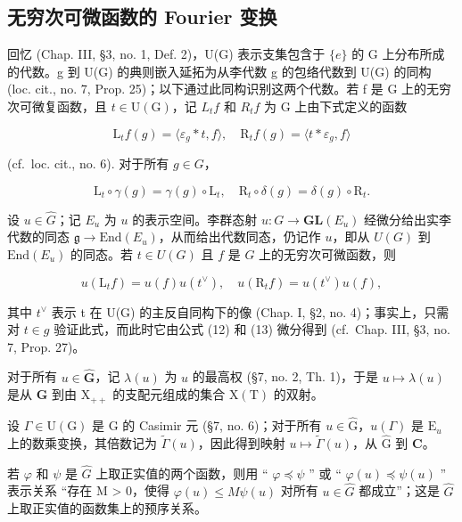 \subsection{无穷次可微函数的 Fourier 变换}

回忆 (Chap. III, §3, no. 1, Def. 2)，U(G) 表示支集包含于 \(\{e\}\) 的 G 上分布所成的代数。g 到 U(G) 的典则嵌入延拓为从李代数 g 的包络代数到 U(G) 的同构 (loc. cit., no. 7, Prop. 25)；以下通过此同构识别这两个代数。若 f 是 G 上的无穷次可微复函数，且 \(t \in \mathrm{U}(\mathrm{G})\)，记 \(L_{t}f\) 和 \(R_{t}f\) 为 G 上由下式定义的函数

\[
\mathrm{L} _ {t} f (g) = \langle \varepsilon_ {g} * t, f \rangle , \quad \mathrm{R} _ {t} f (g) = \langle t * \varepsilon_ {g}, f \rangle
\]

(cf.~loc. cit., no. 6). 对于所有 \(g \in G\)，

\[
\mathrm{L} _ {t} \circ \gamma (g) = \gamma (g) \circ \mathrm{L} _ {t}, \quad \mathrm{R} _ {t} \circ \delta (g) = \delta (g) \circ \mathrm{R} _ {t}.
\]

设 \(u \in \hat{G}\)；记 \(E_u\) 为 \(u\) 的表示空间。李群态射 \(u: G \to \mathbf{GL}(E_u)\) 经微分给出实李代数的同态 \(\mathfrak{g} \to \text{End}(E_u)\)，从而给出代数同态，仍记作 \(u\)，即从 \(U(G)\) 到 \(\text{End}(E_u)\) 的同态。若 \(t \in U(G)\) 且 \(f\) 是 \(G\) 上的无穷次可微函数，则

\[
u (\mathrm{L} _ {t} f) = u (f) u (t ^ {\vee}), \quad u (\mathrm{R} _ {t} f) = u (t ^ {\vee}) u (f),\tag{14}
\]

其中 \(t^{\vee}\) 表示 t 在 U(G) 的主反自同构下的像 (Chap. I, §2, no. 4)；事实上，只需对 \(t \in g\) 验证此式，而此时它由公式 (12) 和 (13) 微分得到 (cf.~Chap. III, §3, no. 7, Prop. 27)。

对于所有 \(u \in \hat{\mathbf{G}}\)，记 \(\lambda(u)\) 为 \(u\) 的最高权 (§7, no. 2, Th. 1)，于是 \(u \mapsto \lambda(u)\) 是从 \(\hat{\mathbf{G}}\) 到由 \(\mathrm{X}_{++}\) 的支配元组成的集合 \(\mathrm{X}(\mathrm{T})\) 的双射。

设 \(\Gamma \in \mathrm{U}(\mathrm{G})\) 是 \(\mathrm{G}\) 的 Casimir 元 (§7, no. 6)；对于所有 \(u \in \hat{\mathrm{G}}\)，\(u(\Gamma)\) 是 \(\mathrm{E}_u\) 上的数乘变换，其倍数记为 \(\tilde{\Gamma}(u)\)，因此得到映射 \(u \mapsto \tilde{\Gamma}(u)\)，从 \(\hat{\mathrm{G}}\) 到 \(\mathbf{C}\)。

若 \(\varphi\) 和 \(\psi\) 是 \(\hat{G}\) 上取正实值的两个函数，则用 `` \(\varphi \preccurlyeq \psi\) '' 或 `` \(\varphi(u) \preccurlyeq \psi(u)\) '' 表示关系 ``存在 M \textgreater{} 0，使得 \(\varphi(u) \leq M\psi(u)\) 对所有 \(u \in \hat{G}\) 都成立''；这是 \(\hat{G}\) 上取正实值的函数集上的预序关系。

